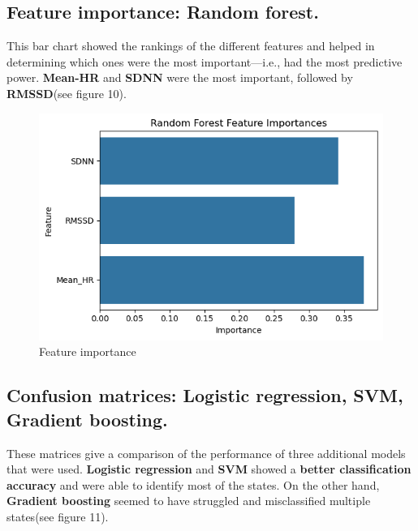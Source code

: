 \documentclass[
  11pt,
]{ieee}
\begin{document}
\subsection{Feature importance: Random
forest.}\label{feature-importance-random-forest.}

\vspace{0.8em}

This bar chart showed the rankings of the different features and helped
in determining which ones were the most important---i.e., had the most
predictive power. \textbf{Mean-HR} and \textbf{SDNN} were the most
important, followed by \textbf{RMSSD}(see figure 10).

\begin{figure}

{\centering \includegraphics{picture_use_ml/9_Feature Importance_Random Forest.png}

}

\caption{Feature importance}

\end{figure}%

\subsection{Confusion matrices: Logistic regression, SVM, Gradient
boosting.}\label{confusion-matrices-logistic-regression-svm-gradient-boosting.}

\vspace{0.8em}

These matrices give a comparison of the performance of three additional
models that were used. \textbf{Logistic regression} and \textbf{SVM}
showed a \textbf{better classification accuracy} and were able to
identify most of the states. On the other hand, \textbf{Gradient
boosting} seemed to have struggled and misclassified multiple states(see
figure 11).
\end{document}

